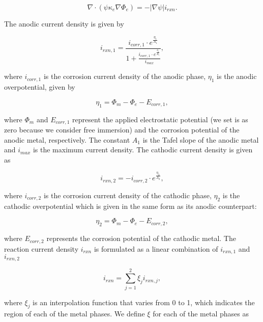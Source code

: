 \documentclass[11pt]{article}
\begin{document}
\begin{equation} \label{Phi_e}
\nabla\cdot\left(\psi\kappa_e\nabla\Phi_e\right) =-|\nabla\psi|i_{rxn}.
\end{equation}

The anodic current density is given by

\begin{equation} \label{i_rxn_1}
i_{rxn,1} = \frac{i_{corr,1}\cdot e^{\frac{\eta_1}{A_1}}}{1+\frac{i_{corr,1}\cdot e^{\frac{\eta_1}{A_{1}}}}{i_{max}}},
\end{equation}

where $i_{corr,1}$ is the corrosion current density of the anodic phase, $\eta_1$ is the anodic overpotential, given by

\begin{equation} \label{eta_1}
\eta_1 = \Phi_m - \Phi_e - E_{corr,1},
\end{equation}

where $\Phi_m$ and $E_{corr,1}$ represent the applied electrostatic potential (we set is as zero because we consider free immersion) and the corrosion potential of the anodic metal, respectively. The constant $A_1$ is the Tafel slope of the anodic metal and $i_{max}$ is the maximum current density. The cathodic current density is given as

\begin{equation} \label{i_rxn_2}
i_{rxn,2}=-i_{corr,2}\cdot e^{\frac{\eta_2}{A_2}},
\end{equation}

where $i_{corr,2}$ is the corrosion current density of the cathodic phase, $\eta_2$ is the cathodic overpotential which is given in the same form as its anodic counterpart:

\begin{equation} \label{eta_2}
\eta_2 = \Phi_m - \Phi_e - E_{corr,2},
\end{equation}

where $E_{corr,2}$ represents the corrosion potential of the cathodic metal. The reaction current density $i_{rxn}$ is formulated as a linear combination of $i_{rxn,1}$ and $i_{rxn,2}$

\begin{equation} \label{i_rxn}
i_{rxn} = \sum^{2}_{j=1}\xi_{j}i_{rxn,j},
\end{equation}

where $\xi_j$ is an interpolation function that varies from 0 to 1, which indicates the region of each of the metal phases. We define $\xi$ for each of the metal phases as
\end{document}

